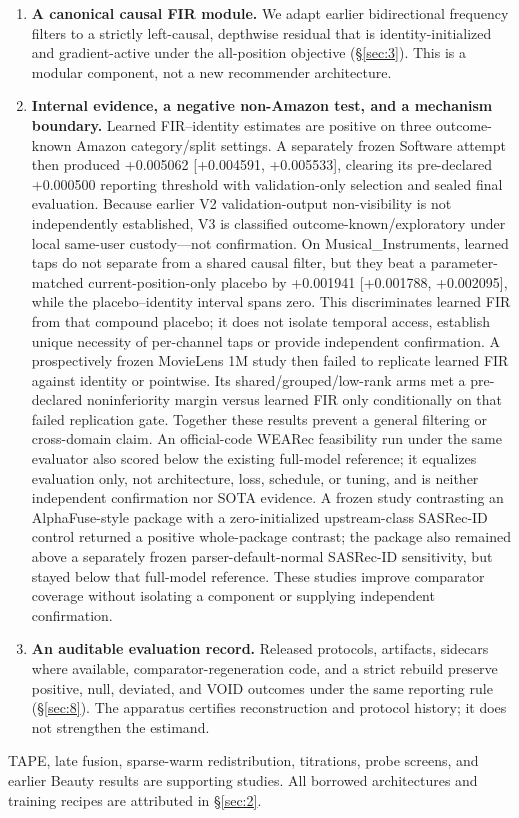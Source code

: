 \begin{enumerate}
\item \textbf{A canonical causal FIR module.} We adapt earlier bidirectional frequency
filters to a strictly left-causal, depthwise residual that is identity-initialized and
gradient-active under the all-position objective (\S\ref{sec:3}). This is a modular
component, not a new recommender architecture.
\item \textbf{Internal evidence, a negative non-Amazon test, and a mechanism boundary.}
Learned FIR--identity estimates are positive on three outcome-known Amazon category/split settings.
A separately frozen Software attempt then produced +0.005062 [+0.004591, +0.005533],
clearing its pre-declared +0.000500 reporting threshold with validation-only selection and
sealed final evaluation. Because earlier V2 validation-output non-visibility is not
independently established, V3 is classified outcome-known/exploratory under local
same-user custody---not confirmation. On Musical\_Instruments, learned taps do not separate from a
shared causal filter, but they beat a parameter-matched current-position-only placebo by
+0.001941 [+0.001788, +0.002095], while the placebo--identity interval spans zero. This
discriminates learned FIR from that compound placebo; it does not isolate temporal access,
establish unique necessity of per-channel taps or provide independent confirmation.
A prospectively frozen MovieLens 1M study then failed to replicate learned FIR against
identity or pointwise. Its shared/grouped/low-rank arms met a pre-declared noninferiority
margin versus learned FIR only conditionally on that failed replication gate. Together
these results prevent a general filtering or cross-domain claim.
An official-code WEARec feasibility run under the same evaluator also scored below the
existing full-model reference; it equalizes evaluation only, not architecture, loss,
schedule, or tuning, and is neither independent confirmation nor SOTA evidence.
A frozen study contrasting an AlphaFuse-style package with a zero-initialized upstream-class SASRec-ID control returned a positive
whole-package contrast; the package also remained above a separately frozen parser-default-normal SASRec-ID sensitivity, but stayed below that full-model reference. These studies improve
comparator coverage without isolating a component or supplying independent confirmation.
\item \textbf{An auditable evaluation record.} Released protocols, artifacts,
sidecars where available, comparator-regeneration code, and a strict rebuild preserve
positive, null, deviated, and VOID outcomes under the same reporting rule
(\S\ref{sec:8}). The apparatus certifies reconstruction and protocol history; it does
not strengthen the estimand.
\end{enumerate}

TAPE, late fusion, sparse-warm redistribution, titrations, probe screens, and earlier
Beauty results are supporting studies. All borrowed architectures and training recipes
are attributed in \S\ref{sec:2}.
